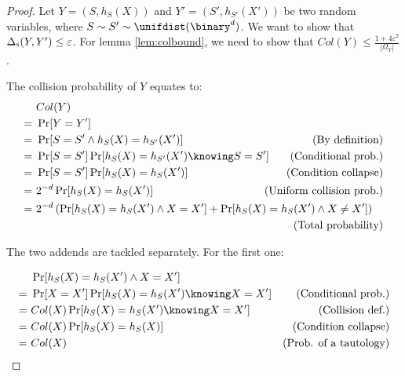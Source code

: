 \begin{proof}
    Let $Y = (S, h_S(X))$ and $Y'= (S', h_{S'}(X'))$ be two \iid{} random variables, where $S \sim S' \sim \unifdist(\binary^d)$. We want to show that $\Delta_\textsc{s}(Y, Y') \leq \varepsilon$. For lemma \ref{lem:colbound}, we need to show that $Col(Y) \leq \frac{1 + 4 \varepsilon^2}{|\Omega_Y|}$.

    The collision probability of $Y$ equates to:
    \begin{align*}
         &\ Col(Y)                                               &                                               \\
        =&\ \Pr[Y = Y']                                          &                                               \\
        =&\ \Pr[S = S' \wedge h_S(X) = h_{S'}(X')]               & \mathllap{\text{(By definition)}}             \\
        =&\ \Pr[S = S'] \Pr[h_S(X) = h_{S'}(X') \knowing S = S'] & \mathllap{\text{(Conditional prob.)}}         \\
        =&\ \Pr[S = S'] \Pr[h_S(X) = h_S(X')]                    & \mathllap{\text{(Condition collapse)}}        \\
        =&\ 2^{-d} \Pr[h_S(X) = h_S(X')]                         & \mathllap{\text{(Uniform collision prob.)}}   \\
        =&\ 2^{-d} \left( \Pr[h_S(X) = h_S(X') \wedge X = X'] + \Pr[h_S(X) = h_S(X') \wedge X \neq X'] \right) & \\
         &                                                       & \mathllap{\text{(Total probability)}}         \\
    \end{align*}

    The two addends are tackled separately. For the first one: 

    \begin{align*}
         &\ \Pr[h_S(X) = h_S(X') \wedge X = X']               &                               \\
        =&\ \Pr[X = X'] \Pr[h_S(X) = h_S(X') \knowing X = X'] & \text{(Conditional prob.)}    \\
        =&\ Col(X) \Pr[h_S(X) = h_S(X') \knowing X = X']      & \text{(Collision def.)}       \\
        =&\ Col(X) \Pr[h_S(X) = h_S(X)]                       & \text{(Condition collapse)}   \\
        =&\ Col(X)                                            & \text{(Prob. of a tautology)} \\
    \end{align*}


\end{proof}
